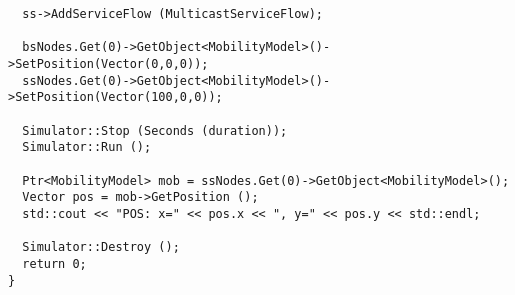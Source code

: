 \documentclass[14pt,a4paper]{article}
\begin{document}
{\begin{verbatim}
  ss->AddServiceFlow (MulticastServiceFlow);

  bsNodes.Get(0)->GetObject<MobilityModel>()->SetPosition(Vector(0,0,0));
  ssNodes.Get(0)->GetObject<MobilityModel>()->SetPosition(Vector(100,0,0));
  
  Simulator::Stop (Seconds (duration));
  Simulator::Run ();

  Ptr<MobilityModel> mob = ssNodes.Get(0)->GetObject<MobilityModel>();
  Vector pos = mob->GetPosition ();
  std::cout << "POS: x=" << pos.x << ", y=" << pos.y << std::endl;

  Simulator::Destroy ();
  return 0;
}

 \end{verbatim}}
\end{document}
